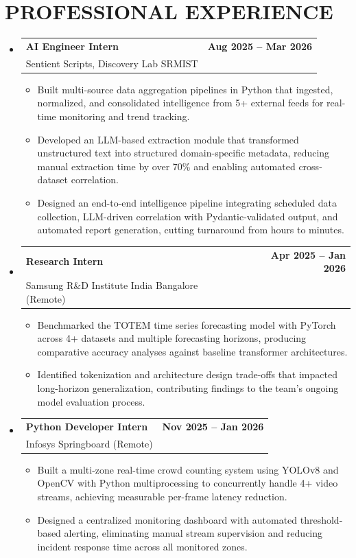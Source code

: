 \documentclass[11pt,letterpaper]{article}
\makeatletter
\newcommand{\resumeSubheading}[4]{
  \vspace{-2pt}
  \item
    \begin{tabular*}{0.97\textwidth}[t]{l@{\extracolsep{\fill}}r}
      \textbf{#1} & \textbf{#2} \\
      #3 & #4 \\
    \end{tabular*}\vspace{-5pt}
}
\makeatother
\begin{document}
\section{PROFESSIONAL EXPERIENCE}
\begin{itemize}[leftmargin=*]

\resumeSubheading
{AI Engineer Intern}{Aug 2025 -- Mar 2026}
{Sentient Scripts, Discovery Lab SRMIST}{}
\begin{itemize}[leftmargin=*]
    \item Built multi-source data aggregation pipelines in Python that ingested, normalized, and consolidated intelligence from 5+ external feeds for real-time monitoring and trend tracking.
    \item Developed an LLM-based extraction module that transformed unstructured text into structured domain-specific metadata, reducing manual extraction time by over 70\% and enabling automated cross-dataset correlation.
    \item Designed an end-to-end intelligence pipeline integrating scheduled data collection, LLM-driven correlation with Pydantic-validated output, and automated report generation, cutting turnaround from hours to minutes.
\end{itemize}

\resumeSubheading
{Research Intern}{Apr 2025 -- Jan 2026}
{Samsung R\&D Institute India Bangalore (Remote)}{}
\begin{itemize}[leftmargin=*]
    \item Benchmarked the TOTEM time series forecasting model with PyTorch across 4+ datasets and multiple forecasting horizons, producing comparative accuracy analyses against baseline transformer architectures.
    \item Identified tokenization and architecture design trade-offs that impacted long-horizon generalization, contributing findings to the team's ongoing model evaluation process.
\end{itemize}

\resumeSubheading
{Python Developer Intern}{Nov 2025 -- Jan 2026}
{Infosys Springboard (Remote)}{}
\begin{itemize}[leftmargin=*]
    \item Built a multi-zone real-time crowd counting system using YOLOv8 and OpenCV with Python multiprocessing to concurrently handle 4+ video streams, achieving measurable per-frame latency reduction.
    \item Designed a centralized monitoring dashboard with automated threshold-based alerting, eliminating manual stream supervision and reducing incident response time across all monitored zones.
\end{itemize}

\end{itemize}
\end{document}
